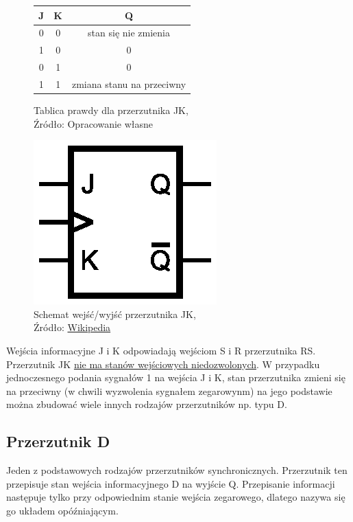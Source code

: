 \documentclass{article}
\begin{document}
      \begin{figure}[!ht]
        \begin{minipage}{.5\textwidth}
            \centering
            \begin{tabular}{|c|c|c|}
            \hline
            \textbf{J} & \textbf{K} & \textbf{Q} \\
            \hline
            0 & 0 & stan się nie zmienia \\
            \hline
            1 & 0 & 0\\
            \hline
            0 & 1 & 0\\
            \hline
            1 & 1 & zmiana stanu na przeciwny\\
            \hline
            \end{tabular}
            \caption{Tablica prawdy dla przerzutnika JK,
            \\Źródło: Opracowanie własne}
        \end{minipage}
        \begin{minipage}{.5\textwidth}
          \centering
          \includegraphics[scale=0.65]{grafiki/JK_Flip-flop.eps}
          \caption{Schemat wejść/wyjść przerzutnika JK,
          \\Źródło: \href{https://pl.wikipedia.org/wiki/Plik:JK_Flip-flop.svg}{Wikipedia}}
        \end{minipage}
      \end{figure}

      Wejścia informacyjne J i K odpowiadają wejściom S i R przerzutnika RS. Przerzutnik JK \underline{nie ma stanów wejściowych niedozwolonych}. W przypadku jednoczesnego podania sygnałów 1 na wejścia J i K, stan przerzutnika zmieni się na przeciwny
      (w chwili wyzwolenia sygnałem zegarowynm) na jego podstawie można zbudować wiele innych rodzajów przerzutników np. typu D.

    \subsection{Przerzutnik D}
      Jeden z podstawowych rodzajów przerzutników synchronicznych. Przerzutnik ten przepisuje stan wejścia informacyjnego D na wyjście Q. Przepisanie informacji następuje tylko przy odpowiednim stanie wejścia zegarowego, dlatego nazywa się go układem opóźniającym.
\end{document}
